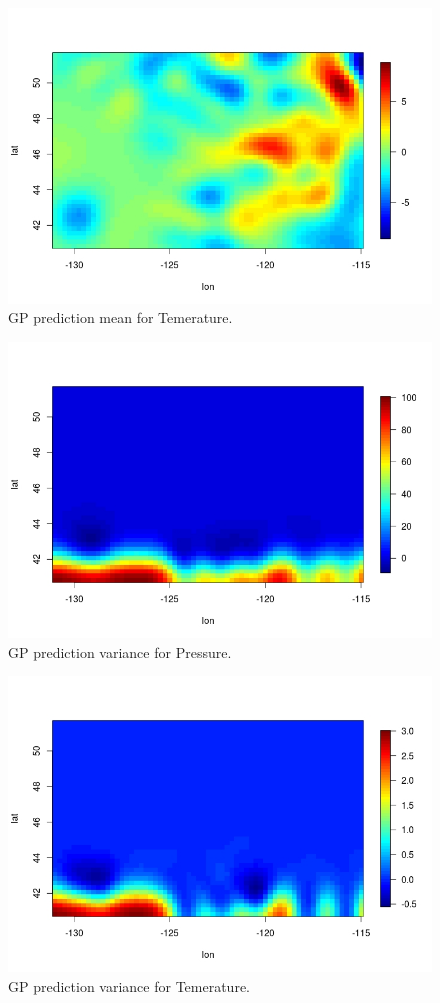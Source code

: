 \documentclass{article}
\begin{document}
\begin{figure}
\includegraphics[width=\textwidth]{weather_tem.jpeg}
\caption{GP prediction mean for Temerature.}
\label{fig:we}
\end{figure}

\begin{figure}
\includegraphics[width=\textwidth]{weather_pressure_var.jpeg}
\caption{GP prediction variance for Pressure.}
\label{fig:we}
\end{figure}


\begin{figure}
\includegraphics[width=\textwidth]{weather_tem_var.jpeg}
\caption{GP prediction variance for Temerature.}
\label{fig:we}
\end{figure}
\end{document}

